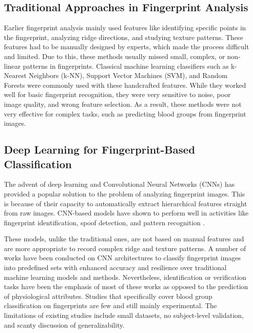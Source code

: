 \documentclass[conference]{IEEEtran}
\begin{document}
\subsection{Traditional Approaches in Fingerprint Analysis}
Earlier fingerprint analysis mainly used features like identifying specific points in the fingerprint, analyzing ridge directions, and studying texture patterns. These features had to be manually designed by experts, which made the process difficult and limited. Due to this, these methods usually missed small, complex, or non-linear patterns in fingerprints. Classical machine learning classifiers such as k-Nearest Neighbors (k-NN), Support Vector Machines (SVM), and Random Forests were commonly used with these handcrafted features. While they worked well for basic fingerprint recognition, they were very sensitive to noise, poor image quality, and wrong feature selection. As a result, these methods were not very effective for complex tasks, such as predicting blood groups from fingerprint images.

\subsection{Deep Learning for Fingerprint-Based Classification}
The advent of deep learning and Convolutional Neural Networks (CNNs) has provided a popular solution to the problem of analyzing fingerprint images. This is because of their capacity to automatically extract hierarchical features straight from raw images. CNN-based models have shown to perform well in activities like fingerprint identification, spoof detection, and pattern recognition \cite{b2, b3}. 

These models, unlike the traditional ones, are not based on manual features and are more appropriate to record complex ridge and texture patterns. A number of works have been conducted on CNN architectures to classify fingerprint images into predefined sets with enhanced accuracy and resilience over traditional machine learning models and methods. Nevertheless, identification or verification tasks have been the emphasis of most of these works as opposed to the prediction of physiological attributes. Studies that specifically cover blood group classification on fingerprints are few and still mainly experimental. The limitations of existing studies include small datasets, no subject-level validation, and scanty discussion of generalizability.
\end{document}
